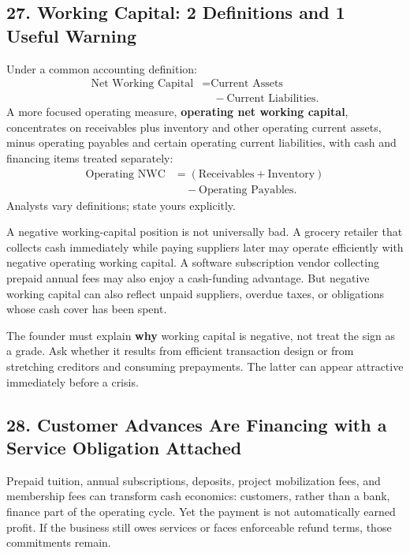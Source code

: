 \subsection*{27. Working Capital: 2 Definitions and 1 Useful Warning}

Under a common accounting definition:
\begin{equation}
\begin{aligned}
\text{Net Working Capital} &= \text{Current Assets} \\
&\quad - \text{Current Liabilities}.
\end{aligned}
\end{equation}
A more focused operating measure, \textbf{operating net working capital}, concentrates on receivables plus inventory and other operating current assets, minus operating payables and certain operating current liabilities, with cash and financing items treated separately:
\begin{equation}
\begin{aligned}
\text{Operating NWC} &= (\text{Receivables} + \text{Inventory}) \\
&\quad - \text{Operating Payables}.
\end{aligned}
\end{equation}
Analysts vary definitions; state yours explicitly.

A negative working-capital position is not universally bad. A grocery retailer that collects cash immediately while paying suppliers later may operate efficiently with negative operating working capital. A software subscription vendor collecting prepaid annual fees may also enjoy a cash-funding advantage. But negative working capital can also reflect unpaid suppliers, overdue taxes, or obligations whose cash cover has been spent.

The founder must explain \textbf{why} working capital is negative, not treat the sign as a grade. Ask whether it results from efficient transaction design or from stretching creditors and consuming prepayments. The latter can appear attractive immediately before a crisis.

\subsection*{28. Customer Advances Are Financing with a Service Obligation Attached}

Prepaid tuition, annual subscriptions, deposits, project mobilization fees, and membership fees can transform cash economics: customers, rather than a bank, finance part of the operating cycle. Yet the payment is not automatically earned profit. If the business still owes services or faces enforceable refund terms, those commitments remain.

